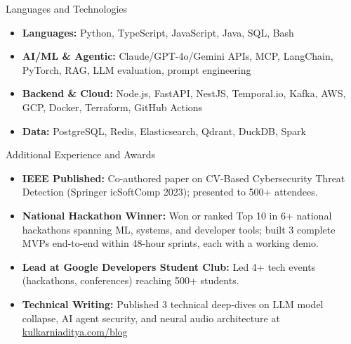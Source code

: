 \documentclass[]{mcdowellcv}
\begin{document}
\begin{cvsection}{Languages and Technologies}
  \begin{cvsubsection}{}{}{}
    \begin{itemize}
      \item \textbf{Languages:} Python, TypeScript, JavaScript, Java, SQL, Bash
      \item \textbf{AI/ML \& Agentic:} Claude/GPT-4o/Gemini APIs, MCP, LangChain, PyTorch, RAG, LLM evaluation, prompt engineering
      \item \textbf{Backend \& Cloud:} Node.js, FastAPI, NestJS, Temporal.io, Kafka, AWS, GCP, Docker, Terraform, GitHub Actions
      \item \textbf{Data:} PostgreSQL, Redis, Elasticsearch, Qdrant, DuckDB, Spark
    \end{itemize}
  \end{cvsubsection}
\end{cvsection}

\begin{cvsection}{Additional Experience and Awards}
  \begin{cvsubsection}{}{}{}
    \begin{itemize}
      \item \textbf{IEEE Published:} Co-authored paper on CV-Based Cybersecurity Threat Detection (Springer icSoftComp 2023); presented to 500+ attendees.
      \item \textbf{National Hackathon Winner:} Won or ranked Top 10 in 6+ national hackathons spanning ML, systems, and developer tools; built 3 complete MVPs end-to-end within 48-hour sprints, each with a working demo.
      \item \textbf{Lead at Google Developers Student Club:} Led 4+ tech events (hackathons, conferences) reaching 500+ students.
      \item \textbf{Technical Writing:} Published 3 technical deep-dives on LLM model collapse, AI agent security, and neural audio architecture at \href{https://www.kulkarniaditya.com/blog}{kulkarniaditya.com/blog}
    \end{itemize}
  \end{cvsubsection}
\end{cvsection}
\end{document}
